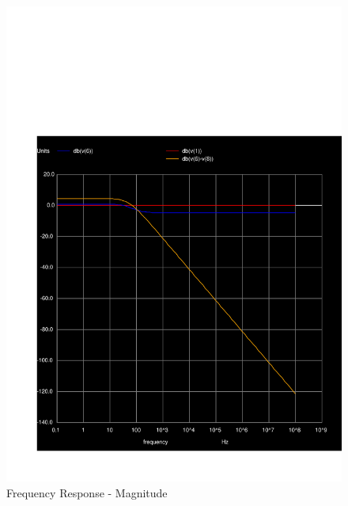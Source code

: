   \begin{figure}[H] \centering
    \includegraphics[width=1\linewidth]{../sim/mag5.pdf}
    \caption{Frequency Response - Magnitude}
    \label{fig:p5mag}
    \end{figure}

